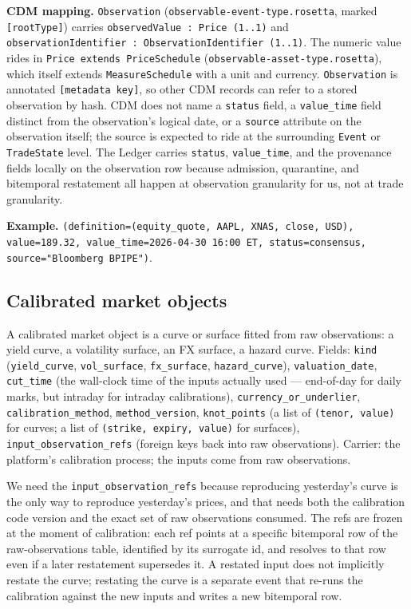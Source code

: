\documentclass[11pt,a4paper]{article}
\begin{document}
\textbf{CDM mapping.} \texttt{Observation} (\texttt{observable-event-type.rosetta}, marked \texttt{[rootType]}) carries \texttt{observedValue : Price (1..1)} and \texttt{observationIdentifier : ObservationIdentifier (1..1)}. The numeric value rides in \texttt{Price extends PriceSchedule} (\texttt{observable-asset-type.rosetta}), which itself extends \texttt{MeasureSchedule} with a unit and currency. \texttt{Observation} is annotated \texttt{[metadata key]}, so other CDM records can refer to a stored observation by hash. CDM does not name a \texttt{status} field, a \texttt{value\_time} field distinct from the observation's logical date, or a \texttt{source} attribute on the observation itself; the source is expected to ride at the surrounding \texttt{Event} or \texttt{TradeState} level. The Ledger carries \texttt{status}, \texttt{value\_time}, and the provenance fields locally on the observation row because admission, quarantine, and bitemporal restatement all happen at observation granularity for us, not at trade granularity.

\textbf{Example.} \texttt{(definition=(equity\_quote, AAPL, XNAS, close, USD), value=189.32, value\_time=2026-04-30 16:00 ET, status=consensus, source="Bloomberg BPIPE")}.

\subsection{Calibrated market objects}

A calibrated market object is a curve or surface fitted from raw observations: a yield curve, a volatility surface, an FX surface, a hazard curve. Fields: \texttt{kind} (\texttt{yield\_curve}, \texttt{vol\_surface}, \texttt{fx\_surface}, \texttt{hazard\_curve}), \texttt{valuation\_date}, \texttt{cut\_time} (the wall-clock time of the inputs actually used --- end-of-day for daily marks, but intraday for intraday calibrations), \texttt{currency\_or\_underlier}, \texttt{calibration\_method}, \texttt{method\_version}, \texttt{knot\_points} (a list of \texttt{(tenor, value)} for curves; a list of \texttt{(strike, expiry, value)} for surfaces), \texttt{input\_observation\_refs} (foreign keys back into raw observations). Carrier: the platform's calibration process; the inputs come from raw observations.

We need the \texttt{input\_observation\_refs} because reproducing yesterday's curve is the only way to reproduce yesterday's prices, and that needs both the calibration code version and the exact set of raw observations consumed. The refs are frozen at the moment of calibration: each ref points at a specific bitemporal row of the raw-observations table, identified by its surrogate id, and resolves to that row even if a later restatement supersedes it. A restated input does not implicitly restate the curve; restating the curve is a separate event that re-runs the calibration against the new inputs and writes a new bitemporal row.
\end{document}
